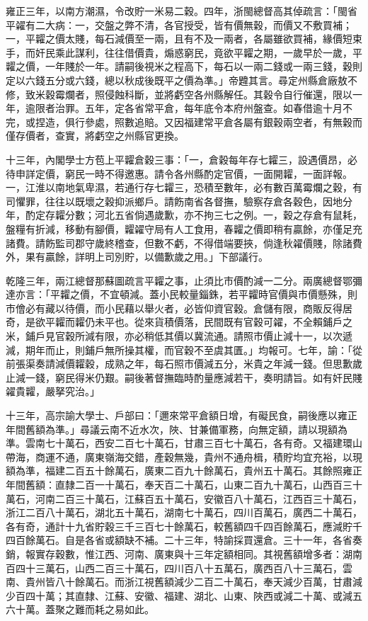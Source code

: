 \begin{pinyinscope}
雍正三年，以南方潮濕，令改貯一米易二穀。四年，浙閩總督高其倬疏言：「閩省平糴有二大病：一，交盤之弊不清，各官授受，皆有價無穀，而價又不敷買補；一，平糶之價太賤，每石減價至一兩，且有不及一兩者，各屬雖欲買補，緣價短束手，而奸民乘此謀利，往往借價貴，煽惑窮民，竟欲平糶之期，一歲早於一歲，平糶之價，一年賤於一年。請嗣後視米之程高下，每石以一兩二錢或一兩三錢，穀則定以六錢五分或六錢，總以秋成後既平之價為準。」帝韙其言。尋定州縣倉廠敖不修，致米穀霉爛者，照侵蝕科斷，並將虧空各州縣解任。其穀令自行催還，限以一年，逾限者治罪。五年，定各省常平倉，每年底令本府州盤查。如春借逾十月不完，或捏造，俱行參處，照數追賠。又因福建常平倉各屬有銀穀兩空者，有無穀而僅存價者，查實，將虧空之州縣官更換。

十三年，內閣學士方苞上平糶倉穀三事：「一，倉穀每年存七糶三，設遇價昂，必待申詳定價，窮民一時不得邀惠。請令各州縣酌定官價，一面開糶，一面詳報。一，江淮以南地氣卑濕，若通行存七糶三，恐積至數年，必有數百萬霉爛之穀，有司懼罪，往往以既壞之穀抑派鄉戶。請飭南省各督撫，驗察存倉各穀色，因地分年，酌定存糶分數；河北五省倘遇歲歉，亦不拘三七之例。一，穀之存倉有鼠耗，盤糧有折減，移動有腳價，糶糴守局有人工食用，春糶之價即稍有贏餘，亦僅足充諸費。請飭監司郡守歲終稽查，但數不虧，不得借端要挾，倘逢秋糴價賤，除諸費外，果有贏餘，詳明上司別貯，以備歉歲之用。」下部議行。

乾隆三年，兩江總督那蘇圖疏言平糶之事，止須比市價酌減一二分。兩廣總督鄂彌達亦言：「平糶之價，不宜頓減。蓋小民較量錙銖，若平糶時官價與市價懸殊，則市儈必有藏以待價，而小民藉以舉火者，必皆仰資官穀。倉儲有限，商販反得居奇，是欲平糶而糶仍未平也。從來貨積價落，民間既有官穀可糴，不全賴鋪戶之米，鋪戶見官穀所減有限，亦必稍低其價以冀流通。請照市價止減十一，以次遞減，期年而止，則鋪戶無所操其權，而官穀不至虞其匱。」均報可。七年，諭：「從前張渠奏請減價糶穀，成熟之年，每石照巿價減五分，米貴之年減一錢。但思歉歲止減一錢，窮民得米仍艱。嗣後著督撫臨時酌量應減若干，奏明請旨。如有奸民賤糴貴糶，嚴拏究治。」

十三年，高宗諭大學士、戶部曰：「邇來常平倉額日增，有礙民食，嗣後應以雍正年間舊額為準。」尋議云南不近水次，陜、甘兼備軍務，向無定額，請以現額為準。雲南七十萬石，西安二百七十萬石，甘肅三百七十萬石，各有奇。又福建環山帶海，商運不通，廣東嶺海交錯，產穀無幾，貴州不通舟楫，積貯均宜充裕，以現額為準，福建二百五十餘萬石，廣東二百九十餘萬石，貴州五十萬石。其餘照雍正年間舊額：直隸二百一十萬石，奉天百二十萬石，山東二百九十萬石，山西百三十萬石，河南二百三十萬石，江蘇百五十萬石，安徽百八十萬石，江西百三十萬石，浙江二百八十萬石，湖北五十萬石，湖南七十萬石，四川百萬石，廣西二十萬石，各有奇，通計十九省貯穀三千三百七十餘萬石，較舊額四千四百餘萬石，應減貯千四百餘萬石。自是各省或額缺不補。二十三年，特諭採買還倉。三十一年，各省奏銷，報實存穀數，惟江西、河南、廣東與十三年定額相同。其視舊額增多者：湖南百四十三萬石，山西二百三十萬石，四川百八十五萬石，廣西百八十三萬石，雲南、貴州皆八十餘萬石。而浙江視舊額減少二百二十萬石，奉天減少百萬，甘肅減少百四十萬；其直隸、江蘇、安徽、福建、湖北、山東、陜西或減二十萬、或減五六十萬。蓋聚之難而耗之易如此。


\end{pinyinscope}
